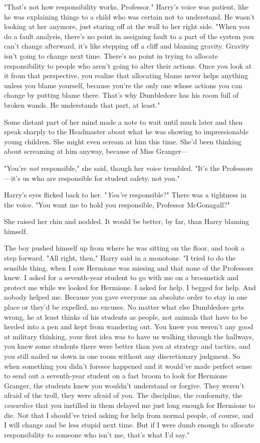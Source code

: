 "That's not how responsibility works, Professor." Harry's voice was patient,
like he was explaining things to a child who was certain not to understand. He
wasn't looking at her anymore, just staring off at the wall to her right side.
"When you do a fault analysis, there's no point in assigning fault to a part of
the system you can't change afterward, it's like stepping off a cliff and
blaming gravity. Gravity isn't going to change next time. There's no point in
trying to allocate responsibility to people who aren't going to alter their
actions. Once you look at it from that perspective, you realize that allocating
blame never helps anything unless you blame yourself, because you're the only
one whose actions you can change by putting blame there. That's why Dumbledore
has his room full of broken wands. He understands that part, at least."

Some distant part of her mind made a note to wait until much later and then
speak sharply to the Headmaster about what he was showing to impressionable
young children. She might even scream at him this time. She'd been thinking
about screaming at him anyway, because of Miss Granger\mbox{---}

"You're \emph{not} responsible," she said, though her voice trembled. "It's the
Professors---it's us who are responsible for student safety, not you."

Harry's eyes flicked back to her. "\emph{You're} responsible?" There was a
tightness in the voice. "You want me to hold you responsible, Professor
McGonagall?"

She raised her chin and nodded. It would be better, by far, than Harry blaming
himself.

The boy pushed himself up from where he was sitting on the floor, and took a
step forward. "All right, then," Harry said in a monotone. "I tried to do the
sensible thing, when I saw Hermione was missing and that none of the Professors
knew. I asked for a seventh-year student to go with me on a broomstick and
protect me while we looked for Hermione. I asked for help. I begged for help.
And nobody helped me. Because you gave everyone an absolute order to stay in
one place or they'd be expelled, no excuses. No matter what else Dumbledore
gets wrong, he at least thinks of his students as people, not animals that have
to be herded into a pen and kept from wandering out. You knew you weren't any
good at military thinking, your first idea was to have us walking through the
hallways, you knew some students there were better than you at strategy and
tactics, and you still nailed us down in one room without any discretionary
judgment. So when something you didn't foresee happened and it would've made
perfect sense to send out a seventh-year student on a fast broom to look for
Hermione Granger, the students knew you wouldn't understand or forgive. They
weren't afraid of the troll, they were afraid of you. The discipline, the
conformity, the \emph{cowardice} that you instilled in them delayed me just
long enough for Hermione to die. Not that I should've tried asking for help
from normal people, of course, and I will change and be less stupid next time.
But if I were dumb enough to allocate responsibility to someone who isn't me,
that's what I'd say."

